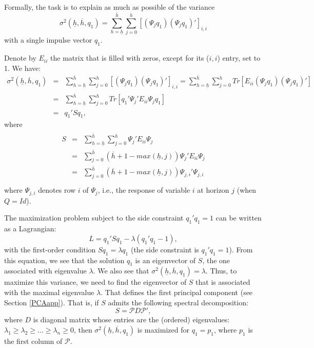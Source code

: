 \documentclass[
  12pt,
]{book}
\theoremstyle{definition}
\theoremstyle{definition}
\theoremstyle{definition}
\theoremstyle{definition}
\theoremstyle{remark}
\begin{document}
Formally, the task is to explain as much as possible of the variance
\[
\sigma^2(\underline{h},\overline{h},q_1)=\sum_{h=\underline{h}}^{\overline{h}} \sum_{j=0}^h\left[(\Psi_jq_1)(\Psi_jq_1)'\right]_{i,i}
\]
with a single impulse vector \(q_1\).

Denote by \(E_{ii}\) the matrix that is filled with zeros, except for its (\(i,i\)) entry, set to 1. We have:
\begin{eqnarray*}
\sigma^2(\underline{h},\overline{h},q_1)&=&\sum_{h=\underline{h}}^{\overline{h}} \sum_{j=0}^h\left[(\Psi_jq_1)(\Psi_jq_1)'\right]_{i,i}=\sum_{h=\underline{h}}^{\overline{h}} \sum_{j=0}^h Tr\left[E_{ii}(\Psi_jq_1)(\Psi_jq_1)'\right]\\
&=&\sum_{h=\underline{h}}^{\overline{h}} \sum_{j=0}^h Tr\left[q_1'\Psi_j'E_{ii}\Psi_j q_1\right]\\
&=& q_1'Sq_1,
\end{eqnarray*}
where
\begin{eqnarray*}
\begin{array}{lll}S&=&\sum_{h=\underline{h}}^{\overline{h}}\sum_{j=0}^{h}\Psi_j'E_{ii}\Psi_j\\
&=&\sum_{j=0}^{\overline{h}}(\overline{h}+1-max(\underline{h},j))\Psi_j'E_{ii}\Psi_j\\
&=&\sum_{j=0}^{\overline{h}}(\overline{h}+1-max(\underline{h},j))\Psi_{j,i}'\Psi_{j,i}\\
\end{array}
\end{eqnarray*}
where \(\Psi_{j,i}\) denotes row \(i\) of \(\Psi_{j}\), i.e., the response of variable \(i\) at horizon \(j\) (when \(Q=Id\)).

The maximization problem subject to the side constraint \(q_1'q_1=1\) can be written as a Lagrangian: \[
L=q_1'Sq_1-\lambda(q_1'q_1-1),
\]
with the first-order condition \(Sq_1=\lambda q_1\) (the side constraint is \(q_1'q_1=1\)). From this equation, we see that the solution \(q_1\) is an eigenvector of \(S\), the one associated with eigenvalue \(\lambda\). We also see that \(\sigma^2(\underline{h},\overline{h},q_1)=\lambda\). Thus, to maximize this variance, we need to find the eigenvector of \(S\) that is associated with the maximal eigenvalue \(\lambda\). That defines the first principal component (see Section \ref{PCAapp}). That is, if \(S\) admits the following spectral decomposition:
\[
S = \mathcal{P}D\mathcal{P}',
\]
where \(D\) is diagonal matrix whose entries are the (ordered) eigenvalues: \(\lambda_1 \ge \lambda_2 \ge \dots \ge \lambda_n \ge 0\), then \(\sigma^2(\underline{h},\overline{h},q_1)\) is maximized for \(q_1 = p_1\), where \(p_1\) is the first column of \(\mathcal{P}\).
\end{document}
